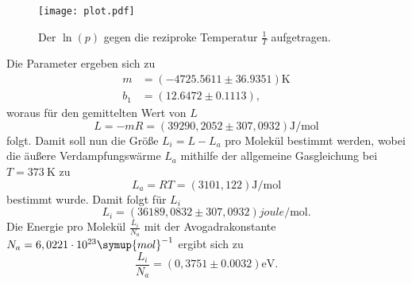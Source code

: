 \begin{figure}[H]
  \centering
  \texttt{[image: plot.pdf]}
  \caption{Der $\ln\left(p\right)$ gegen die reziproke Temperatur $\frac{1}{T}$ aufgetragen.}
  \label{fig:M30-1000}
\end{figure}
\noindent Die Parameter ergeben sich zu
\begin{align*}
  m &= (-4725.5611\pm 36.9351)\unit{\kelvin}\\
  b_1 &= (12.6472\pm 0.1113),
\end{align*}
woraus für den gemittelten Wert von $L$
\begin{equation*}
  L = -mR = (39290,2052\pm 307,0932)\unit{\joule\per\mol}
\end{equation*}
folgt. Damit soll nun die Größe $L_i = L - L_a$ pro Molekül bestimmt werden, wobei die äußere Verdampfungswärme $L_a$ mithilfe der allgemeine Gasgleichung bei $T = \SI{373}{\kelvin}$ zu
\begin{equation*}
  L_a = RT = (3101,122)\unit{\joule\per\mol}
\end{equation*}
bestimmt wurde. Damit folgt für $L_i$
\begin{equation*}
  L_i = (36189,0832\pm 307,0932)\unit{joule\per\mol}.
\end{equation*}
Die Energie pro Molekül $\frac{L_i}{N_a}$ mit der Avogadrakonstante $N_a = 6,0221\cdot 10^{23}\symup{mol}^{-1}$\cite{Gerth} ergibt sich zu
\begin{equation*}
  \frac{L_i}{N_a} = (0,3751\pm 0.0032)\unit{\electronvolt}.
\end{equation*}
